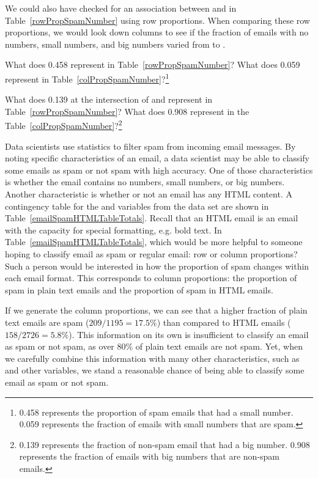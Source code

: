 We could also have checked for an association between  and  in Table~\ref{rowPropSpamNumber} using row proportions. When comparing these row proportions, we would look down columns to see if the fraction of emails with no numbers, small numbers, and big numbers varied from  to .

\begin{exercise}
What does 0.458 represent in Table~\ref{rowPropSpamNumber}? What does 0.059 represent in Table~\ref{colPropSpamNumber}?\footnote{0.458 represents the proportion of spam emails that had a small number. 0.059 represents the fraction of emails with small numbers that are spam.}
\end{exercise}

\begin{exercise}
What does 0.139 at the intersection of  and  represent in Table~\ref{rowPropSpamNumber}? What does 0.908 represent in the Table~\ref{colPropSpamNumber}?\footnote{0.139 represents the fraction of non-spam email that had a big number. 0.908 represents the fraction of emails with big numbers that are non-spam emails.}
\end{exercise}

\begin{example}{Data scientists use statistics to filter spam from incoming email messages. By noting specific characteristics of an email, a data scientist may be able to classify some emails as spam or not spam with high accuracy. One of those characteristics is whether the email contains no numbers, small numbers, or big numbers. Another characteristic is whether or not an email has any HTML content. A contingency table for the  and  variables from the  data set are shown in Table~\ref{emailSpamHTMLTableTotals}. Recall that an HTML email is an email with the capacity for special formatting, e.g. bold text. In Table~\ref{emailSpamHTMLTableTotals}, which would be more helpful to someone hoping to classify email as spam or regular email: row or column proportions?}\label{weighingRowColumnProportions}
Such a person would be interested in how the proportion of spam changes within each email format. This corresponds to column proportions: the proportion of spam in plain text emails and the proportion of spam in HTML emails.

If we generate the column proportions, we can see that a higher fraction of plain text emails are spam ($209/1195 = 17.5\%$) than compared to HTML emails ($158/2726 = 5.8\%$). This information on its own is insufficient to classify an email as spam or not spam, as over 80\% of plain text emails are not spam. Yet, when we carefully combine this information with many other characteristics, such as  and other variables, we stand a reasonable chance of being able to classify some email as spam or not spam.
\end{example}

